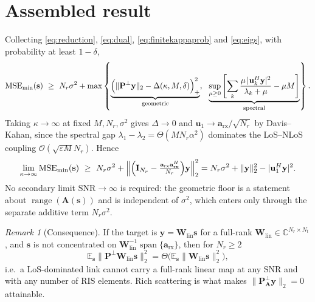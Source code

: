 \documentclass[11pt]{article}
\theoremstyle{remark}
\newtheorem{remark}{Remark}
\begin{document}
\section{Assembled result}

Collecting \eqref{eq:reduction}, \eqref{eq:dual}, \eqref{eq:finitekappaprob} and
\eqref{eq:eigs}, with probability at least $1-\delta$,
\begin{equation}
\mathrm{MSE}_{\min}(\mathbf{s})\ \ge\ N_r\sigma^2+\max\left\{
\underbrace{\Bigl(\|\mathbf{P}^{\perp}\mathbf{y}\|_2
            -\Delta(\kappa,M,\delta)\Bigr)_{+}^{2}}_{\text{geometric}},
\ \
\underbrace{\sup_{\mu\ge0}\left[\sum_{k}
 \frac{\mu\,|\mathbf{u}_k^{H}\mathbf{y}|^2}{\lambda_k+\mu}-\mu M\right]}
 _{\text{spectral}}
\right\}.
\label{eq:assembled}
\end{equation}
Taking $\kappa\to\infty$ at fixed $M,N_r,\sigma^2$ gives $\Delta\to0$ and
$\mathbf{u}_1\to\mathbf{a}_{\mathrm{rx}}/\sqrt{N_r}$ by Davis--Kahan, since the
spectral gap $\lambda_1-\lambda_2=\Theta(MN_r\alpha^2)$ dominates the LoS--NLoS
coupling $\mathcal{O}(\sqrt{\varepsilon M}N_r)$. Hence
\begin{equation}
\lim_{\kappa\to\infty}\mathrm{MSE}_{\min}(\mathbf{s})
\ \ge\ N_r\sigma^2
+\left\|\Bigl(\mathbf{I}_{N_r}
 -\tfrac{\mathbf{a}_{\mathrm{rx}}\mathbf{a}_{\mathrm{rx}}^{H}}{N_r}\Bigr)
 \mathbf{y}\right\|_2^2
= N_r\sigma^2+\|\mathbf{y}\|_2^2-|\mathbf{u}_1^{H}\mathbf{y}|^2 .
\label{eq:limit}
\end{equation}
No secondary limit $\mathrm{SNR}\to\infty$ is required: the geometric floor is a
statement about $\operatorname{range}(\mathbf{A}(\mathbf{s}))$ and is
independent of $\sigma^2$, which enters only through the separate additive term
$N_r\sigma^2$.

\begin{remark}[Consequence]
If the target is $\mathbf{y}=\mathbf{W}_{\mathrm{lin}}\mathbf{s}$ for a
full-rank $\mathbf{W}_{\mathrm{lin}}\in\mathbb{C}^{N_r\times N_t}$, and
$\mathbf{s}$ is not concentrated on
$\mathbf{W}_{\mathrm{lin}}^{-1}\operatorname{span}
 \{\mathbf{a}_{\mathrm{rx}}\}$, then for $N_r\ge2$
\begin{equation}
\mathbb{E}_{\mathbf{s}}
 \bigl\|\mathbf{P}^{\perp}\mathbf{W}_{\mathrm{lin}}\mathbf{s}\bigr\|_2^2
=\Theta\bigl(\mathbb{E}_{\mathbf{s}}
 \|\mathbf{W}_{\mathrm{lin}}\mathbf{s}\|_2^2\bigr),
\label{eq:consequence}
\end{equation}
i.e.\ a LoS-dominated link cannot carry a full-rank linear map at any SNR and
with any number of RIS elements. Rich scattering is what makes
$\|\mathbf{P}^{\perp}_{\mathbf{A}}\mathbf{y}\|_2=0$ attainable.
\end{remark}
\end{document}
